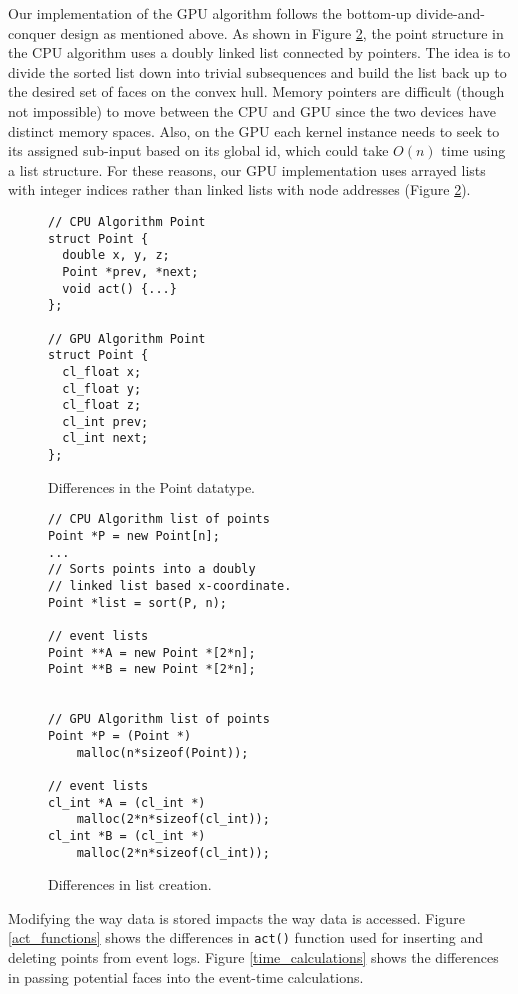 \documentclass{article}
\begin{document}
Our implementation of the GPU algorithm follows the bottom-up divide-and-conquer design as mentioned above. As shown in Figure \ref{point_lists}, the point structure in the CPU algorithm uses a doubly linked list connected by pointers. The idea is to divide the sorted list down into trivial subsequences and build the list back up to the desired set of faces on the convex hull. Memory pointers are difficult (though not impossible) to move between the CPU and GPU since the two devices have distinct memory spaces. Also, on the GPU each kernel instance needs to seek to its assigned sub-input based on its global id, which could take $O(n)$ time using a list structure. For these reasons, our GPU implementation uses arrayed lists with integer indices rather than linked lists with node addresses (Figure \ref{point_lists}).

\begin{figure}
\begin{lstlisting}
// CPU Algorithm Point
struct Point {
  double x, y, z;
  Point *prev, *next;
  void act() {...}
};

// GPU Algorithm Point
struct Point { 
  cl_float x;
  cl_float y;
  cl_float z;  
  cl_int prev;
  cl_int next;
};
\end{lstlisting}
\caption{Differences in the Point datatype.}
\label{point_datatypes}
\end{figure}

\begin{figure}
\begin{lstlisting}
// CPU Algorithm list of points
Point *P = new Point[n];
...
// Sorts points into a doubly 
// linked list based x-coordinate.
Point *list = sort(P, n);

// event lists
Point **A = new Point *[2*n];
Point **B = new Point *[2*n];


// GPU Algorithm list of points
Point *P = (Point *) 
    malloc(n*sizeof(Point));

// event lists
cl_int *A = (cl_int *) 
    malloc(2*n*sizeof(cl_int));
cl_int *B = (cl_int *) 
    malloc(2*n*sizeof(cl_int));
\end{lstlisting}
\caption{Differences in list creation.}
\label{point_lists}
\end{figure}

Modifying the way data is stored impacts the way data is accessed. Figure \ref{act_functions} shows the differences in \texttt{act()} function used for inserting and deleting points from event logs. Figure \ref{time_calculations} shows the differences in passing potential faces into the event-time calculations.
\end{document}
